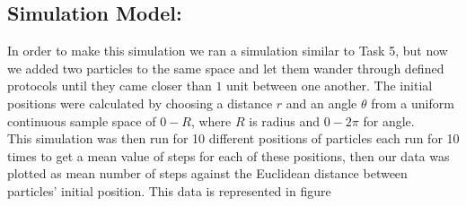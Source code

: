 \documentclass[8pt]{extarticle}
\begin{document}
\subsection*{Simulation Model:}
In order to make this simulation we ran a simulation similar to Task 5, but now we added two particles to the same space and let them wander through defined protocols until they came closer than $1$ unit between one another. The initial positions were calculated by choosing a distance $r$ and an angle $\theta$ from a uniform continuous sample space of $0-R$, where $R$ is radius and $0-2\pi$ for angle.\\
This simulation was then run for 10 different positions of particles each run for 10 times to get a mean value of steps for each of these positions, then our data was plotted as mean number of steps against the Euclidean distance between particles' initial position. This data is represented in figure %
\end{document}
